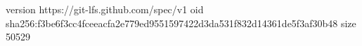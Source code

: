 version https://git-lfs.github.com/spec/v1
oid sha256:f3be6f3cc4fceeacfa2e779ed9551597422d3da531f832d14361de5f3af30b48
size 50529
